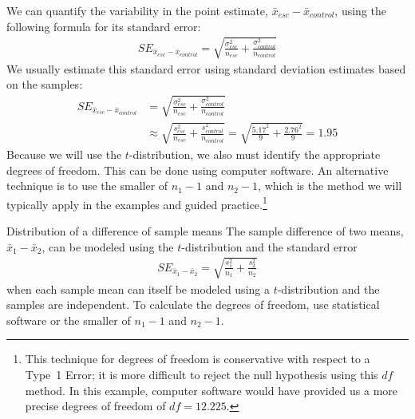 

We can quantify the variability in the point estimate, $\bar{x}_{esc} - \bar{x}_{control}$, using the following formula for its standard error:
\begin{align*}
SE_{\bar{x}_{esc} - \bar{x}_{control}}
  = \sqrt{\frac{\sigma_{esc}^2}{n_{esc}}
      + \frac{\sigma_{control}^2}{n_{control}}}
\end{align*}
We usually estimate this standard error using standard deviation estimates  based on the samples:
\begin{align*}
SE_{\bar{x}_{esc} - \bar{x}_{control}}
	&= \sqrt{\frac{\sigma_{esc}^2}{n_{esc}} + \frac{\sigma_{control}^2}{n_{control}}} \\
	&\approx \sqrt{\frac{s_{esc}^2}{n_{esc}} + \frac{s_{control}^2}{n_{control}}}
	= \sqrt{\frac{5.17^2}{9} + \frac{2.76^2}{9}} = 1.95
\end{align*}
Because we will use the $t$-distribution, we also must identify the appropriate degrees of freedom. This can be done using computer software. An alternative technique is to use the smaller of $n_1 - 1$ and $n_2 - 1$, which is the method we will typically apply in the examples and guided practice.\footnote{This technique for degrees of freedom is conservative with respect to a Type~1 Error; it is more difficult to reject the null hypothesis using this $df$ method. In this example, computer software would have provided us a more precise degrees of freedom of $df = 12.225$.}

\begin{onebox}{Distribution of a difference of sample means}
The sample difference of two means, $\bar{x}_1 - \bar{x}_2$, can be modeled using the $t$-distribution and the standard error
\begin{align*}
SE_{\bar{x}_{1} - \bar{x}_{2}} = \sqrt{\frac{s_1^2}{n_1} + \frac{s_2^2}{n_2}}
\end{align*}
when each sample mean can itself be modeled using a $t$-distribution and the samples are independent. To calculate the degrees of freedom, use statistical software or the smaller of $n_1 - 1$ and $n_2 - 1$.
\end{onebox}

